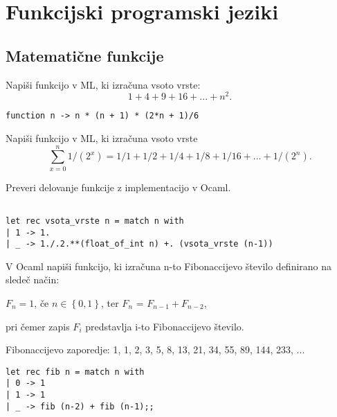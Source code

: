\chapter{Funkcijski programski jeziki}


\section{Matemati\v cne funkcije}



\begin{ex}
Napi\v si funkcijo v ML, ki izra\v cuna vsoto vrste: 
$$1+4+9+16+...+n^2.$$

\begin{sol}
\begin{lstlisting}
function n -> n * (n + 1) * (2*n + 1)/6
\end{lstlisting}
\end{sol}

\end{ex}



\begin{ex}
Napi\v si funkcijo v ML, ki izra\v cuna vsoto vrste 
$$\sum_{x=0}^n 1/(2^x) = 1/1+1/2+1/4+1/8+1/16+...+1/(2^n).$$

Preveri delovanje funkcije z implementacijo v Ocaml.
\begin{sol}
\begin{lstlisting}
    
let rec vsota_vrste n = match n with
| 1 -> 1.
| _ -> 1./.2.**(float_of_int n) +. (vsota_vrste (n-1))
\end{lstlisting}
\end{sol}
\end{ex}



\begin{ex}
V Ocaml napi\v si funkcijo, ki izra\v cuna n-to Fibonaccijevo \v stevilo definirano na slede\v c na\v cin:
\begin{center}
$F_n = 1$, \v ce $n\in \left\{ 0,1\right\}$, ter 
$F_n$ = $F_{n-1} + F_{n-2}$, 
\end{center}
pri \v cemer zapis $F_i$ predstavlja i-to Fibonaccijevo \v stevilo. 

Fibonaccijevo zaporedje: 1, 1, 2, 3, 5, 8, 13, 21, 34, 55, 89, 144, 233, ...

\begin{sol}
\begin{lstlisting}
let rec fib n = match n with
| 0 -> 1
| 1 -> 1
| _ -> fib (n-2) + fib (n-1);;
\end{lstlisting}
\end{sol}
\end{ex}



